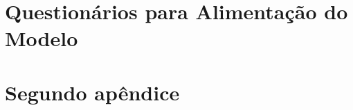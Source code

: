 \chapter{Questionários para Alimentação do Modelo}
\label{questionarios}

\chapter{Segundo apêndice}
